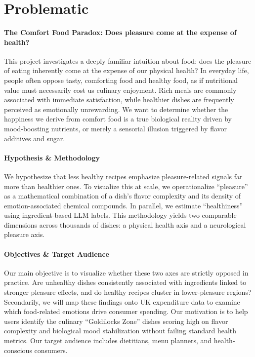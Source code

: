 \documentclass{article}
\begin{document}
\newpage

\section{Problematic}
\paragraph{The Comfort Food Paradox: Does pleasure come at the expense of health?}
This project investigates a deeply familiar intuition about food: does the pleasure of eating inherently come at the expense of our physical health? In everyday life, people often oppose tasty, comforting food and healthy food, as if nutritional value must necessarily cost us culinary enjoyment. Rich meals are commonly associated with immediate satisfaction, while healthier dishes are frequently perceived as emotionally unrewarding. We want to determine whether the happiness we derive from comfort food is a true biological reality driven by mood-boosting nutrients, or merely a sensorial illusion triggered by flavor additives and sugar.

\paragraph{Hypothesis \& Methodology}
We hypothesize that less healthy recipes emphasize pleasure-related signals far more than healthier ones. To visualize this at scale, we operationalize \enquote{pleasure} as a mathematical combination of a dish's flavor complexity and its density of emotion-associated chemical compounds. In parallel, we estimate \enquote{healthiness} using ingredient-based LLM labels. This methodology yields two comparable dimensions across thousands of dishes: a physical health axis and a neurological pleasure axis.

\paragraph{Objectives \& Target Audience}
Our main objective is to visualize whether these two axes are strictly opposed in practice. Are unhealthy dishes consistently associated with ingredients linked to stronger pleasure effects, and do healthy recipes cluster in lower-pleasure regions? Secondarily, we will map these findings onto UK expenditure data to examine which food-related emotions drive consumer spending. Our motivation is to help users identify the culinary \enquote{Goldilocks Zone} dishes scoring high on flavor complexity and biological mood stabilization without failing standard health metrics. Our target audience includes dietitians, menu planners, and health-conscious consumers.
\end{document}
